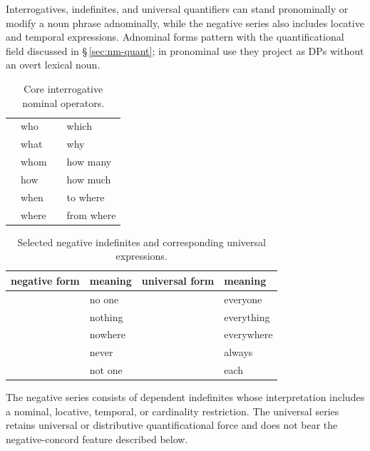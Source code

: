 Interrogatives, indefinites, and universal quantifiers can stand pronominally
or modify a noun phrase adnominally, while the negative series also includes
locative and temporal expressions. Adnominal forms pattern with the
quantificational field discussed in §\,\ref{sec:nm-quant}; in pronominal use they project as DPs without an overt lexical noun.

\begin{table}[ht]
  \footnotesize
  \caption{Core interrogative nominal operators.}
  \label{tab:nm-interrogatives}
  \begin{tabularx}{0.8\textwidth}{L L L L}
    \toprule
     & who &  & which \\
     & what &  & why \\
     & whom &  & how many \\
     & how &  & how much \\
     & when &  & to where \\
     & where &  & from where \\
    \bottomrule
  \end{tabularx}
\end{table}

\begin{table}[ht]
  \footnotesize
  \caption{Selected negative indefinites and corresponding universal expressions.}
  \label{tab:nm-indefinites}
  \begin{tabularx}{0.8\textwidth}{L L L L}
    \toprule
    {\sc negative form} & {\sc meaning} & {\sc universal form} &
    {\sc meaning} \\
    \midrule
     & no one &  & everyone \\
     & nothing &  & everything \\
     & nowhere &  & everywhere \\
     & never &  & always \\
     & not one &  & each \\
    \bottomrule
  \end{tabularx}
\end{table}

The negative series consists of dependent
indefinites whose interpretation includes a nominal, locative, temporal, or
cardinality restriction. The universal series retains universal or
distributive quantificational force and does not bear the negative-concord
feature described below.

